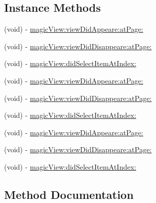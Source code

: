 \subsection*{Instance Methods}
\begin{DoxyCompactItemize}
\item 
(void) -\/ \mbox{\hyperlink{protocol_v_t_magic_view_delegate_01-p_a420539e4f986c5a46636ac50290a1914}{magic\+View\+:view\+Did\+Appeare\+:at\+Page\+:}}
\item 
(void) -\/ \mbox{\hyperlink{protocol_v_t_magic_view_delegate_01-p_a229eb01dedc2a2bb58f924e1775b3263}{magic\+View\+:view\+Did\+Disappeare\+:at\+Page\+:}}
\item 
(void) -\/ \mbox{\hyperlink{protocol_v_t_magic_view_delegate_01-p_aa2799cd468eca3c1ebbcab8dcb375717}{magic\+View\+:did\+Select\+Item\+At\+Index\+:}}
\item 
(void) -\/ \mbox{\hyperlink{protocol_v_t_magic_view_delegate_01-p_a420539e4f986c5a46636ac50290a1914}{magic\+View\+:view\+Did\+Appeare\+:at\+Page\+:}}
\item 
(void) -\/ \mbox{\hyperlink{protocol_v_t_magic_view_delegate_01-p_a229eb01dedc2a2bb58f924e1775b3263}{magic\+View\+:view\+Did\+Disappeare\+:at\+Page\+:}}
\item 
(void) -\/ \mbox{\hyperlink{protocol_v_t_magic_view_delegate_01-p_aa2799cd468eca3c1ebbcab8dcb375717}{magic\+View\+:did\+Select\+Item\+At\+Index\+:}}
\item 
(void) -\/ \mbox{\hyperlink{protocol_v_t_magic_view_delegate_01-p_a420539e4f986c5a46636ac50290a1914}{magic\+View\+:view\+Did\+Appeare\+:at\+Page\+:}}
\item 
(void) -\/ \mbox{\hyperlink{protocol_v_t_magic_view_delegate_01-p_a229eb01dedc2a2bb58f924e1775b3263}{magic\+View\+:view\+Did\+Disappeare\+:at\+Page\+:}}
\item 
(void) -\/ \mbox{\hyperlink{protocol_v_t_magic_view_delegate_01-p_aa2799cd468eca3c1ebbcab8dcb375717}{magic\+View\+:did\+Select\+Item\+At\+Index\+:}}
\end{DoxyCompactItemize}


\subsection{Method Documentation}
\mbox{\label{protocol_v_t_magic_view_delegate_01-p_aa2799cd468eca3c1ebbcab8dcb375717}} 
